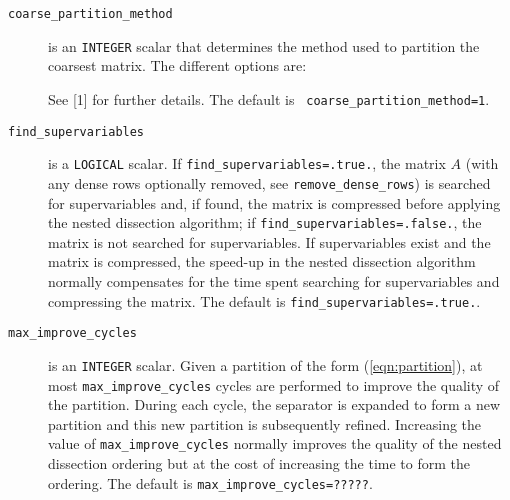 \begin{description}
\item[\texttt{coarse\_partition\_method}] is an {\tt INTEGER} scalar that determines the method 
used to partition the coarsest matrix. The different options are:
See [1] for further details. The default is {\tt
coarse\_partition\_method=1}. 


\item[\texttt{find\_supervariables}] is a {\tt LOGICAL} scalar. If 
{\tt find\_supervariables=.true.}, the matrix $A$ (with any dense rows 
optionally removed, see {\tt remove\_dense\_rows}) is searched for 
supervariables and, if found, the matrix is compressed before applying the 
nested dissection algorithm; if {\tt find\_supervariables=.false.}, the matrix 
is not searched for supervariables. If supervariables exist and the matrix is 
compressed, the speed-up in the nested dissection algorithm normally 
compensates for the time spent searching for supervariables and compressing the 
matrix. The default is {\tt find\_supervariables=.true.}.



\item[\texttt{max\_improve\_cycles}] is an {\tt INTEGER} scalar. Given a partition of the 
form (\ref{eqn:partition}), at most {\tt max\_improve\_cycles} cycles are 
performed to improve the quality of the partition. During each cycle, the 
separator is expanded to form a new partition and this new partition is 
subsequently refined. Increasing the value of {\tt max\_improve\_cycles} normally improves 
the quality of the nested dissection ordering but at the cost of increasing the 
time to form the ordering. The default is {\tt max\_improve\_cycles=?????}.


\end{description}
